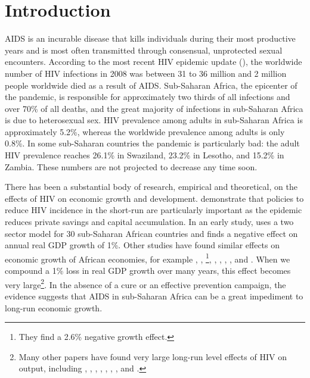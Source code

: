 \documentclass[12pt]{article}
\newcommand{\citee}[1]{\citet*{#1}}
\begin{document}
\newpage

\section{Introduction}\label{s:intro}

AIDS is an incurable disease that kills individuals during their most productive years and is most often transmitted through consensual, unprotected sexual encounters.  According to the most recent HIV epidemic update (\citee{UNA2009}), the worldwide number of HIV infections in 2008 was between 31 to 36 million and 2 million people worldwide died as a result of AIDS.  Sub-Saharan Africa, the epicenter of the pandemic, is responsible for approximately two thirds of all infections and over 70\% of all deaths, and the great majority of infections in sub-Saharan Africa is due to heterosexual sex.  HIV prevalence among adults in sub-Saharan Africa is approximately 5.2\%, whereas the worldwide prevalence among adults is only 0.8\%.  In some sub-Saharan countries the pandemic is particularly bad: the adult HIV prevalence reaches 26.1\% in Swaziland, 23.2\% in Lesotho, and 15.2\% in Zambia.  These numbers are not projected to decrease any time soon.

There has been a substantial body of research, empirical and theoretical, on the effects of HIV on economic growth and development.  \citee{RVP2002} demonstrate that policies to reduce HIV incidence in the short-run are particularly important as the epidemic reduces private savings and capital accumulation.  In an early study, \citee{O1992} uses a two sector model for 30 sub-Saharan African countries and finds a negative effect on annual real GDP growth of 1\%.  Other studies have found similar effects on economic growth of African economies, for example \citee{KDO1992}, \citee{CH1994}, \citee{Al2000}\footnote{They find a 2.6\% negative growth effect.}, \citee{B2000}, \citee{WBL2000}, \citee{WBS2001a}, \citee{WBN2001b}, and \citee{DMR2001}. When we compound a 1\% loss in real GDP growth over many years, this effect becomes very large\footnote{Many other papers have found very large long-run level effects of HIV on output, including \citee{C1993b}, \citee{CH1995}, \citee{BIDPA2000}, \citee{Arndt2003}, \citee{BDG2003}, \citee{RS2007}, \citee{RS2008}, and \citee{PDA2008}.}. In the absence of a cure or an effective prevention campaign, the evidence suggests that AIDS in sub-Saharan Africa can be a great impediment to long-run economic growth.  
\end{document}
